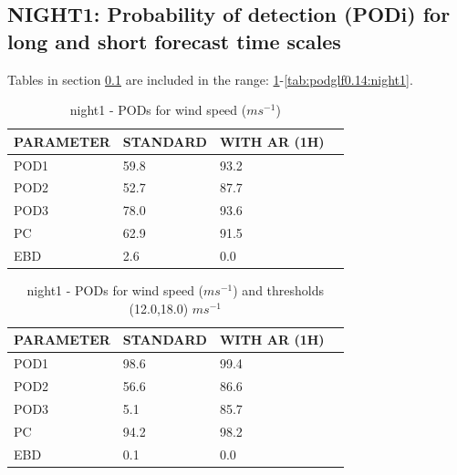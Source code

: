 \subsection{NIGHT1: Probability of detection (PODi) for long and short forecast time scales}\label{subsec:night1:pod}
Tables in section \ref{subsec:night1:pod} are included in the range: \ref{tab:podws:night1}-\ref{tab:podglf0.14:night1}.
\begin{table}[h!]
\begin{center}
\begin{tabular}{|l|l|l|l|}
\hline
\multicolumn{1}{|c|}{\cellcolor[HTML]{C0C0C0}\textbf{PARAMETER}} & \multicolumn{1}{c|}{\cellcolor[HTML]{C0C0C0}\textbf{STANDARD}} & \multicolumn{1}{c|}{\cellcolor[HTML]{C0C0C0}\textbf{WITH AR (1H)}} \\
\hline
\cellcolor[HTML]{C0C0C0}POD1  & 59.8                                & 93.2         \\
\cellcolor[HTML]{C0C0C0}POD2  & 52.7                                & 87.7         \\
\cellcolor[HTML]{C0C0C0}POD3  & 78.0                                & 93.6         \\
\cellcolor[HTML]{C0C0C0}PC    & 62.9                                  & 91.5           \\
\cellcolor[HTML]{C0C0C0}EBD   & 2.6                                 & 0.0          \\
\hline
\end{tabular}
\caption{night1 - PODs for wind speed ($m s^{-1}$)}
\label{tab:podws:night1}
\end{center}
\end{table}
\begin{table}[h!]
\begin{center}
\begin{tabular}{|l|l|l|l|}
\hline
\multicolumn{1}{|c|}{\cellcolor[HTML]{C0C0C0}\textbf{PARAMETER}} & \multicolumn{1}{c|}{\cellcolor[HTML]{C0C0C0}\textbf{STANDARD}} & \multicolumn{1}{c|}{\cellcolor[HTML]{C0C0C0}\textbf{WITH AR (1H)}} \\
\hline
\cellcolor[HTML]{C0C0C0}POD1  & 98.6   & 99.4         \\
\cellcolor[HTML]{C0C0C0}POD2  & 56.6   & 86.6         \\
\cellcolor[HTML]{C0C0C0}POD3  & 5.1   & 85.7         \\
\cellcolor[HTML]{C0C0C0}PC    & 94.2     & 98.2           \\
\cellcolor[HTML]{C0C0C0}EBD   & 0.1    & 0.0          \\
\hline
\end{tabular}
\caption{night1 - PODs for wind speed ($m s^{-1}$) and thresholds (12.0,18.0) $m s^{-1}$}
\label{tab:podwsFT:night1}
\end{center}
\end{table}

